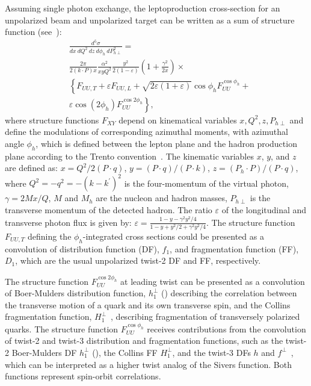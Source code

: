 \documentclass[aps,prl,twocolumn,showpacs,superscriptaddress,groupedaddress]{revtex4}  %
\newcommand{\zh}{z}
\newcommand{\xbj}{x}
\newcommand{\ph}{\phi_h}
\begin{document}
Assuming single photon exchange, the leptoproduction cross-section for an unpolarized beam and unpolarized target can be written as a sum of structure function (see~\cite{Bacchetta:2006tn}):
\begin{equation}
\label{eq:crosssection3}
\begin{split}
& \frac{d^{5} \sigma}{dx\ dQ^2\ dz\ d \phi_{h}\ dP_{h \perp}^{2}} =
\\
& \frac{2\pi}{2(k\cdot P)x} \frac{\alpha^{2}}{xyQ^{2}} \frac{y^{2}}{2 \left( 1 - \varepsilon \right)} \left( 1 + \frac{\gamma^{2}}{2x} \right) \times
\\
& \left\{ F_{UU,T} + \varepsilon F_{UU,L} + \sqrt{2 \varepsilon \left( 1 + \varepsilon \right)} \cos \phi_{h} F^{\cos \phi_{h}}_{UU} + \right.
\\
& \left. \varepsilon \cos \left( 2 \phi_{h} \right) F_{UU}^{\cos2\phi_{h}} \right\},
\end{split}
\end{equation}
where structure functions $F_{XY}$ depend on kinematical variables $x,Q^2,z,P_{h\perp}$ and define the modulations of corresponding azimuthal moments, with azimuthal angle $\phi_{h}$, which is defined between the lepton plane and the hadron production plane according to the Trento convention~\cite{Bacchetta:2004jz}.
The kinematic variables $\xbj$, $y$, and $z$  are defined as: 
$\xbj = Q^2/{2(P\cdot q)}$, $y={(P \cdot q)/(P \cdot k)}$, $\zh=(P_h \cdot P)/(P \cdot q)$, 
where $Q^2=-q^2=-(k-k^\prime)^2$ is the four-momentum 
of the virtual photon,  $\gamma=2M\xbj /Q$,
 $M$ and $M_h$ are the nucleon and hadron masses, $P_{h\perp}$ is the transverse momentum of the 
detected hadron.  The ratio $\varepsilon$ of the longitudinal and transverse photon flux is given by: $\varepsilon=\frac{1-y-\gamma^2y^2/4}{1-y+y^2/2+\gamma^2y^2/4}$.
The structure function  $F_{UU,T}$  defining the $\phi_h$-integrated cross sections could be presented as a convolution of  distribution function (DF), $f_1$,   and fragmentation function (FF), $D_1$, which  are the usual unpolarized twist-2 DF and FF, respectively. 

The structure function $F^{\cos 2\ph}_{UU}$ at leading twist can be presented as a convolution of Boer-Mulders distribution function, $h_1^\perp$ (\cite{Boer:1997nt}) describing the correlation between the transverse motion
of a quark and its own transverse spin, and  the Collins fragmentation function, $H_1^{\perp}$~\cite{Collins:1992kk}, describing fragmentation of transversely polarized quarks.
The structure function $F^{\cos \ph}_{UU}$  receives contributions 
from the convolution of twist-2 and twist-3 distribution and fragmentation functions,
such as the twist-2 Boer-Mulders DF $h_1^\perp$ (\cite{Boer:1997nt,Pasquini:2010af}), the Collins FF $H_1^{\perp}$, and the twist-3 DFs $h$ and $f^\perp$~\cite{Bacchetta:2006tn}, which can be interpreted as a higher twist analog of the Sivers function. Both functions represent spin-orbit correlations. 
\end{document}
